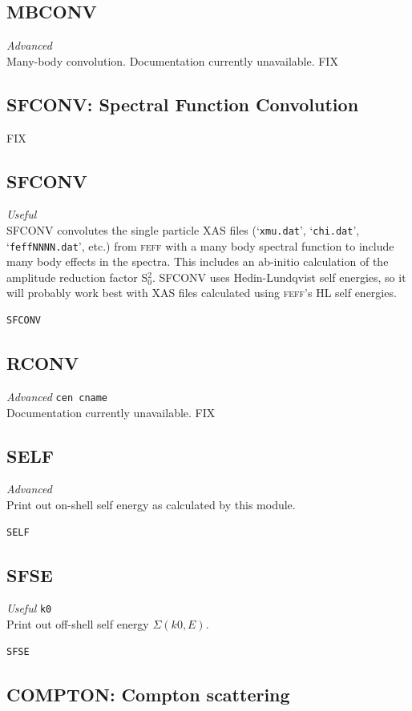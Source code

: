 \documentclass[11pt,oneside]{report} %
\newcommand{\program}[1]{\textsc{#1}}
\newcommand{\feff}{\program{feff}}
\newenvironment{Card}[4]%
      {\vspace{3ex}%
        \subsection{#1}
        \quad\textsl{#3}\newline
        \quad\texttt{#2}\newline%
        \label{card:#4}\\}
      {}
\newcommand{\file}[1]{`\texttt{#1}'}
\begin{document}
\begin{Card}{MBCONV}{}{Advanced}{mbc}
  Many-body convolution.  Documentation currently unavailable. FIX
\end{Card}



\begin{latexonly}
\subsection{SFCONV: Spectral Function Convolution} FIX
\label{sec:Sfconv-modul}
\end{latexonly}



\begin{Card}{SFCONV}{}{Useful}{sfc}
  SFCONV convolutes the single particle XAS files (\file{xmu.dat}, 
  \file{chi.dat}, \file{feffNNNN.dat}, etc.) from {\feff} with a many 
  body spectral function to include many body effects in the spectra. 
  This includes an ab-initio calculation of the amplitude reduction 
  factor S$_0^2$. SFCONV uses Hedin-Lundqvist self energies, so it 
  will probably work best with XAS files calculated using {\feff}'s 
  HL self energies.
\begin{verbatim}
SFCONV
\end{verbatim}
\end{Card}



\begin{Card}{RCONV}{cen cname}{Advanced}{rco}
  Documentation currently unavailable. FIX
\end{Card}



\begin{Card}{SELF}{}{Advanced}{sel}
  Print out on-shell self energy as calculated by this module.
\begin{verbatim}
SELF
\end{verbatim}
\end{Card}



\begin{Card}{SFSE}{k0}{Useful}{sfs}
Print out off-shell self energy $\Sigma(k0,E)$.
\begin{verbatim}
SFSE
\end{verbatim}
\end{Card}




\subsection{COMPTON: Compton scattering} 
\label{sec:Compton-modul}
\end{document}
